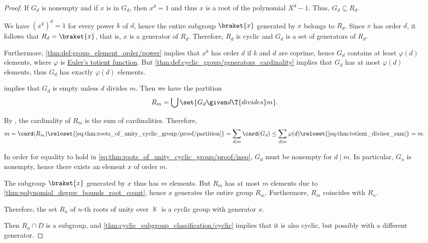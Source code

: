 \begin{proof}
  If \( G_d \) is nonempty and if \( x \) is in \( G_d \), then \( x^d = 1 \) and thus \( x \) is a root of the polynomial \( X^d - 1 \). Thus, \( G_d \subseteq R_d \).

  We have \( (x^k)^d = 1 \) for every power \( k \) of \( d \), hence the entire subgroup \( \braket{ x } \) generated by \( x \) belongs to \( R_d \). Since \( x \) has order \( d \), it follows that \( R_d = \braket{ x } \), that is, \( x \) is a generator of \( R_d \). Therefore, \( R_d \) is cyclic and \( G_d \) is a set of generators of \( R_d \).

  Furthermore, \cref{thm:def:group_element_order/power} implies that \( x^k \) has order \( d \) if \( k \) and \( d \) are coprime, hence \( G_d \) contains at least \( \varphi(d) \) elements, where \( \varphi \) is \hyperref[def:eulers_totient_function]{Euler's totient function}. But \cref{thm:def:cyclic_group/generators_cardinality} implies that \( G_d \) has at most \( \varphi(d) \) elements, thus \( G_d \) has exactly \( \varphi(d) \) elements.

   implies that \( G_d \) is empty unless \( d \) divides \( m \). Then we have the partition
  \begin{equation}\label{eq:thm:roots_of_unity_cyclic_group/proof/partition}
    R_m = \bigcup \set{ G_d \given d \T{divides} m }.
  \end{equation}

  By , the cardinality of \( R_m \) is the sum of cardinalities. Therefore,
  \begin{equation}\label{eq:thm:roots_of_unity_cyclic_group/proof/ineq}
    m
    =
    \card(R_m)
    \reloset {\eqref{eq:thm:roots_of_unity_cyclic_group/proof/partition}} =
    \sum_{d \mid m} \card(G_d)
    \leq
    \sum_{d \mid m} \varphi(d)
    \reloset {\eqref{eq:thm:totient_divisor_sum}} =
    m.
  \end{equation}

  In order for equality to hold in \eqref{eq:thm:roots_of_unity_cyclic_group/proof/ineq}, \( G_d \) must be nonempty for \( d \mid m \). In particular, \( G_n \) is nonempty, hence there exists an element \( x \) of order \( m \).

  The subgroup \( \braket{ x } \) generated by \( x \) thus has \( m \) elements. But \( R_m \) has at most \( m \) elements due to \cref{thm:polynomial_degree_bounds_root_count}, hence \( x \) generates the entire group \( R_m \). Furthermore, \( R_m \) coincides with \( R_n \).

  Therefore, the set \( R_n \) of \( n \)-th roots of unity over \( \BbbK \) is a cyclic group with generator \( x \).

  Then \( R_n \cap D \) is a subgroup, and \cref{thm:cyclic_subgroup_classification/cyclic} implies that it is also cyclic, but possibly with a different generator.
\end{proof}

